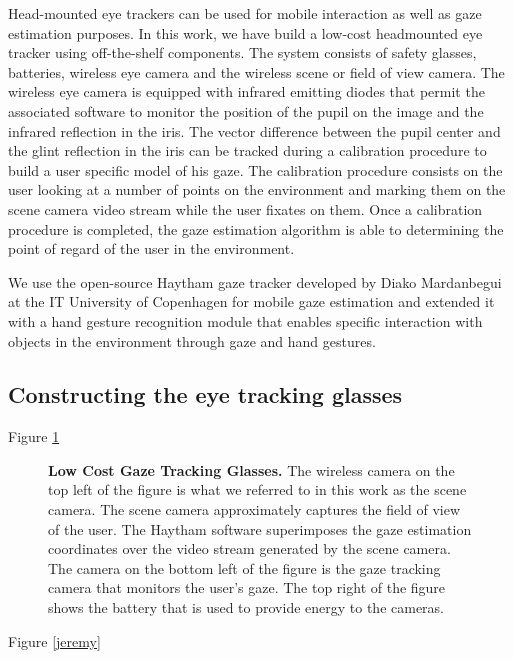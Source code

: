 \documentclass[jou,a4paper,notxfonts]{apa}
\begin{document}
Head-mounted eye trackers can be used for mobile interaction as well as gaze estimation purposes.
In this work, we have build a low-cost headmounted eye tracker using off-the-shelf components.  The system consists of
safety glasses, batteries, wireless eye camera and the wireless scene or field of view camera. The wireless eye camera
is equipped with infrared emitting diodes that permit the associated software to monitor the position of the pupil on the
image and the infrared reflection in the iris. The vector difference between the pupil center and the glint reflection
in the iris can be tracked during a calibration procedure to build a user specific model of his gaze. The calibration
procedure consists on the user looking at a number of points on the environment and marking them on the scene camera
video stream while the user fixates on them.  Once a calibration procedure is completed, the gaze estimation algorithm
is able to determining the point of regard of the user in the environment.


We use the open-source Haytham \cite{Mardanbegi2011} gaze tracker developed by Diako Mardanbegui at the IT University of
Copenhagen for mobile gaze estimation and extended it with a hand gesture recognition module that enables specific
interaction with objects in the environment through gaze and hand gestures.

\subsection{Constructing the eye tracking glasses}

Figure \ref{gazeTrackingGlasses}

\begin{figure}[tp]
 \caption{\textbf{Low Cost Gaze Tracking Glasses.} The wireless camera on the top left of the figure is what we
 referred to in this work as the scene camera. The scene camera approximately captures the field of view of the user.
 The Haytham software superimposes the gaze estimation coordinates over the  video stream generated by the scene
 camera. The camera on the bottom left of the figure is the gaze tracking camera that monitors the user's gaze. The
 top right of the figure shows the battery that is used to provide energy to the cameras.}
 \label{gazeTrackingGlasses}
\end{figure}


Figure \ref{jeremy}
\end{document}
